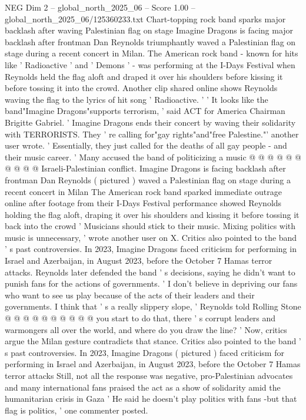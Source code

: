 \begin{textsample}{NEG Dim 2 – global\_north\_2025\_06 – Score 1.00 – global\_north\_2025\_06/125360233.txt}  \label{ex:f2_neg_221}
Chart-topping rock band sparks major backlash after waving Palestinian flag on stage Imagine Dragons is facing major backlash after frontman Dan Reynolds triumphantly waved a Palestinian flag on stage during a recent concert in Milan.
The American rock band - known for hits like ' Radioactive ' and ' Demons ' - was performing at the I-Days Festival when Reynolds held the flag aloft and draped it over his shoulders before kissing it before tossing it into the crowd.
Another clip shared online shows Reynolds waving the flag to the lyrics of hit song ' Radioactive. ' ' It looks like the band"Imagine Dragons"supports terrorism, ' said ACT for America Chairman Brigitte Gabriel. ' Imagine Dragons ends their concert by waving their solidarity with TERRORISTS.
They ' re calling for"gay rights"and"free Palestine."' another user wrote. ' Essentially, they just called for the deaths of all gay people - and their music career. ' Many accused the band of politicizing a music @ @ @ @ @ @ @ @ @ @ Israeli-Palestinian conflict.
Imagine Dragons is facing backlash after frontman Dan Reynolds ( pictured ) waved a Palestinian flag on stage during a recent concert in Milan The American rock band sparked immediate outrage online after footage from their I-Days Festival performance showed Reynolds holding the flag aloft, draping it over his shoulders and kissing it before tossing it back into the crowd ' Musicians should stick to their music.
Mixing politics with music is unnecessary, ' wrote another user on X.
Critics also pointed to the band ' s past controversies.
In 2023, Imagine Dragons faced criticism for performing in Israel and Azerbaijan, in August 2023, before the October 7 Hamas terror attacks.
Reynolds later defended the band ' s decisions, saying he didn't want to punish fans for the actions of governments. ' I don't believe in depriving our fans who want to see us play because of the acts of their leaders and their governments.
I think that ' s a really slippery slope, ' Reynolds told Rolling Stone @ @ @ @ @ @ @ @ @ @ you start to do that, there ' s corrupt leaders and warmongers all over the world, and where do you draw the line? ' Now, critics argue the Milan gesture contradicts that stance.
Critics also pointed to the band ' s past controversies.
In 2023, Imagine Dragons ( pictured ) faced criticism for performing in Israel and Azerbaijan, in August 2023, before the October 7 Hamas terror attacks Still, not all the response was negative, pro-Palestinian advocates and many international fans praised the act as a show of solidarity amid the humanitarian crisis in Gaza ' He said he doesn't play politics with fans -but that flag is politics, ' one commenter posted.

\end{textsample}
